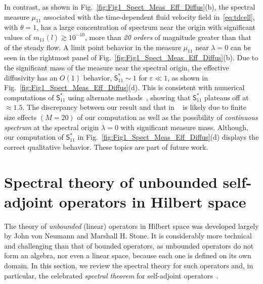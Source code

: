 \documentclass[leqno,onefignum,onetabnum]{siamltex1213}
\newcommand{\figref}[1]{Fig.~\ref{#1}}
\newcommand{\Sm}{\mathsf{S}}
\begin{document}
In contrast, as shown in \figref{fig:Fig1_Spect_Meas_Eff_Diffus}(b),
the spectral measure $\mu_{11}$ associated with the time-dependent fluid
velocity field in~\eqref{eq:tdcell}, with $\theta=1$, has a large
concentration of spectrum near the origin with significant values of
$m_{11}(l)\gtrsim10^{-10}$, more than \emph{20 orders} of magnitude greater than
that of the steady flow. A limit point behavior in the measure
$\mu_{11}$ near $\lambda=0$ can be seen in the rightmost panel of
\figref{fig:Fig1_Spect_Meas_Eff_Diffus}(b). Due to the significant 
mass of the measure near the spectral origin, the effective
diffusivity has an $O(1)$ behavior, $\Sm^*_{11}\sim1$ for $\varepsilon\ll1$, as shown
in \figref{fig:Fig1_Spect_Meas_Eff_Diffus}(d). This is consistent with
numerical computations of $\Sm^*_{11}$ using alternate 
methods~\cite{Biferale:PF:2725}, showing that $\Sm^*_{11}$ plateaus
off at $\approx1.5$. The discrepancy between our result and that in
~\cite{Biferale:PF:2725} is likely due to finite size effects $(M=20)$
of our computation as well as the possibility of \emph{continuous
  spectrum} at the spectral origin $\lambda=0$ with significant measure
mass. Although, our computation of $\Sm^*_{11}$ in
\figref{fig:Fig1_Spect_Meas_Eff_Diffus}(d) displays the correct
qualitative behavior. These topics are part of future work.





\appendix
%

\section{Spectral theory of unbounded self-adjoint operators in
  Hilbert space} \label{sec:Spectral_Theory}    
%
The theory of \emph{unbounded} (linear) operators in Hilbert
space was developed largely by John von Neumann and Marshall H. Stone. It
is considerably more technical and challenging than that of bounded
operators, as unbounded operators do not form an algebra, nor even a
linear space, because each one is defined on its own domain. In this
section, we review the spectral theory for such operators and, in
particular, the celebrated \emph{spectral theorem} for self-adjoint
operators~\cite{Reed-1980,Stone:64}.
\end{document}
